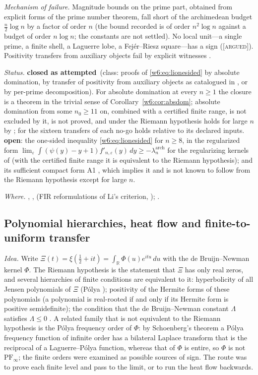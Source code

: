 \documentclass[11pt]{amsart}
\theoremstyle{definition}
\theoremstyle{remark}
\numberwithin{equation}{section}
\newcommand{\R}{\mathbb{R}}
\newcommand{\stag}[1]{\textsc{[#1]}}
\newcommand{\ARGUED}{\stag{argued}}
\newcommand{\rtag}[1]{\textbf{\small\textsf{#1}}}
\newcommand{\closedA}{\rtag{closed as attempted}}
\newcommand{\openR}{\rtag{open}}
\newcommand{\entry}[1]{\par\smallskip\noindent\textit{#1.}\enspace}
\begin{document}
\entry{Mechanism of failure} Magnitude bounds on the prime part, obtained from explicit forms of
the prime number theorem, fall short of the archimedean budget $\frac n2\log n$ by a factor of
order $n$ (the bound recorded is of order $n^2\log n$ against a budget of order $n\log n$; the
constants are not settled). No local unit---a single prime, a finite shell, a Laguerre lobe, a
Fej\'er--Riesz square---has a sign (\ARGUED). Positivity transfers from auxiliary objects fail by
explicit witnesses \cite{P37}.

\entry{Status} \closedA\ (class: proofs of \eqref{w6:eq:lionesided} by absolute domination, by
transfer of positivity from auxiliary objects as catalogued in \cite{P37}, or by per-prime
decomposition). For absolute domination at every $n\ge1$ the closure is a theorem in the trivial
sense of Corollary~\ref{w6:cor:absdom}; absolute domination from some $n_0\ge11$ on, combined with a
certified finite range, is not excluded by it, is not proved, and under the Riemann hypothesis
holds for large $n$ by \cite{BombieriLagarias1999}; for the sixteen transfers of \cite{P37} each no-go holds relative to
its declared inputs. \openR: the one-sided inequality \eqref{w6:eq:lionesided} for $n\ge8$, in the regularized
form $\lim_\varepsilon\int(\psi(y)-y+1)f'_{n,\varepsilon}(y)\,dy\ge-\lambda_n^{\mathrm{arch}}$ for
the regularizing kernels of \cite{P36} (with the certified finite range it is equivalent to the
Riemann hypothesis); and its sufficient compact form A1 \cite[Theorem~9.135]{P36}, which implies it
and is not known to follow from the Riemann hypothesis except for large $n$.

\entry{Where} \cite[Section~9]{P36}, \cite{P37}, \cite{P38} (FIR reformulations of Li's criterion,
\cite[Theorems~3.1 and 4.1]{P38}); \cite{Li1997,Keiper1992,BombieriLagarias1999}.

\subsection{Polynomial hierarchies, heat flow and finite-to-uniform transfer}\label{w6:fam:R14}

\entry{Idea} Write $\Xi(t)=\xi(\frac12+it)=\int_\R\Phi(u)e^{itu}\,du$ with the de Bruijn--Newman
kernel $\Phi$. The Riemann hypothesis is the statement that $\Xi$ has only real zeros, and several
hierarchies of finite conditions are equivalent to it: hyperbolicity of all Jensen polynomials of
$\Xi$ (P\'olya \cite{Polya1927}); positivity of the Hermite forms of these polynomials (a
polynomial is real-rooted if and only if its Hermite form is positive semidefinite); the condition
that the de Bruijn--Newman constant $\Lambda$ satisfies $\Lambda\le0$
\cite{deBruijn1950,Newman1976}. A related family that is not equivalent to the Riemann
hypothesis is the P\'olya frequency order of $\Phi$: by Schoenberg's theorem \cite{Schoenberg1951}
a P\'olya frequency function of infinite order has a bilateral Laplace transform that is the
reciprocal of a Laguerre--P\'olya function, whereas that of $\Phi$ is entire, so $\Phi$ is not
$\mathrm{PF}_\infty$; the finite orders were examined as possible sources of sign. The route
was to prove each finite level and pass to the limit, or to run the heat flow backwards.
\end{document}
